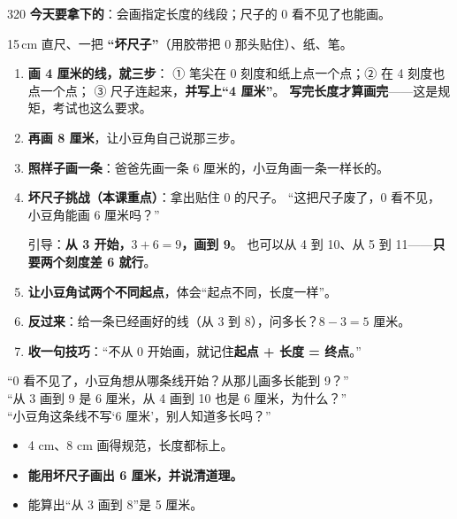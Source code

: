 \begin{lesson}{3}{20}
\textbf{今天要拿下的}：会画指定长度的线段；尺子的 0 看不见了也能画。

\begin{materials}
15\,cm 直尺、一把 \textbf{“坏尺子”}（用胶带把 0 那头贴住）、纸、笔。
\end{materials}

\begin{enumerate}
  \item \textbf{画 4 厘米的线，就三步}：
        ① 笔尖在 0 刻度和纸上点一个点；② 在 4 刻度也点一个点；
        ③ 尺子连起来，\textbf{并写上“4 厘米”}。
        \textbf{写完长度才算画完}——这是规矩，考试也这么要求。
  \item \textbf{再画 8 厘米}，让小豆角自己说那三步。
  \item \textbf{照样子画一条}：爸爸先画一条 6 厘米的，小豆角画一条一样长的。
  \item \textbf{坏尺子挑战（本课重点）}：拿出贴住 0 的尺子。
        “这把尺子废了，0 看不见，小豆角能画 6 厘米吗？”
        \begin{center}
        \end{center}
        引导：\textbf{从 3 开始，$3+6=9$，画到 9}。
        也可以从 4 到 10、从 5 到 11——\textbf{只要两个刻度差 6 就行}。
  \item \textbf{让小豆角试两个不同起点}，体会“起点不同，长度一样”。
  \item \textbf{反过来}：给一条已经画好的线（从 3 到 8），问多长？$8-3=5$ 厘米。
  \item \textbf{收一句技巧}：“不从 0 开始画，就记住\textbf{起点 + 长度 = 终点}。”
\end{enumerate}

\begin{saybox}
“0 看不见了，小豆角想从哪条线开始？从那儿画多长能到 9？”\\
“从 3 画到 9 是 6 厘米，从 4 画到 10 也是 6 厘米，为什么？”\\
“小豆角这条线不写‘6 厘米’，别人知道多长吗？”
\end{saybox}

\begin{passbox}
\begin{itemize}
  \item 4 cm、8 cm 画得规范，长度都标上。
  \item \textbf{能用坏尺子画出 6 厘米，并说清道理。}
  \item 能算出“从 3 画到 8”是 5 厘米。
\end{itemize}
\end{passbox}
\end{lesson}

